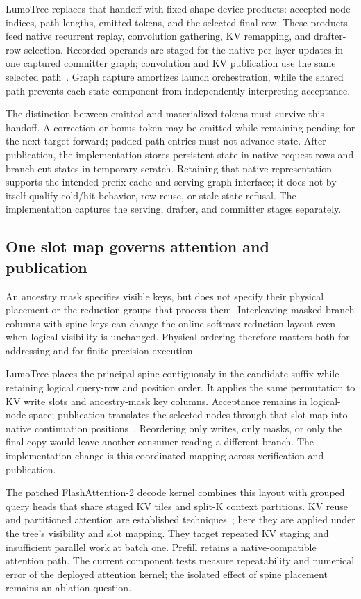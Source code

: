 \documentclass[conference]{IEEEtran}
\newcommand{\sys}{LumoTree}
\begin{document}
\sys{} replaces that handoff with fixed-shape device products: accepted node indices, path lengths, emitted tokens, and the selected final row. These products feed native recurrent replay, convolution gathering, KV remapping, and drafter-row selection. Recorded operands are staged for the native per-layer updates in one captured committer graph; convolution and KV publication use the same selected path~\cite{lumo2026archive}. Graph capture amortizes launch orchestration, while the shared path prevents each state component from independently interpreting acceptance.

The distinction between emitted and materialized tokens must survive this handoff. A correction or bonus token may be emitted while remaining pending for the next target forward; padded path entries must not advance state. After publication, the implementation stores persistent state in native request rows and branch cut states in temporary scratch. Retaining that native representation supports the intended prefix-cache and serving-graph interface; it does not by itself qualify cold/hit behavior, row reuse, or stale-state refusal. The implementation captures the serving, drafter, and committer stages separately.

\subsection{One slot map governs attention and publication}
\label{sec:reconstruction-numerics}
An ancestry mask specifies visible keys, but does not specify their physical placement or the reduction groups that process them. Interleaving masked branch columns with spine keys can change the online-softmax reduction layout even when logical visibility is unchanged. Physical ordering therefore matters both for addressing and for finite-precision execution~\cite{he2025determinism}.

\sys{} places the principal spine contiguously in the candidate suffix while retaining logical query-row and position order. It applies the same permutation to KV write slots and ancestry-mask key columns. Acceptance remains in logical-node space; publication translates the selected nodes through that slot map into native continuation positions~\cite{lumo2026archive}. Reordering only writes, only masks, or only the final copy would leave another consumer reading a different branch. The implementation change is this coordinated mapping across verification and publication.

The patched FlashAttention-2 decode kernel combines this layout with grouped query heads that share staged KV tiles and split-K context partitions. KV reuse and partitioned attention are established techniques~\cite{yao2024deft,pan2025fasttree}; here they are applied under the tree's visibility and slot mapping. They target repeated KV staging and insufficient parallel work at batch one. Prefill retains a native-compatible attention path. The current component tests measure repeatability and numerical error of the deployed attention kernel; the isolated effect of spine placement remains an ablation question.
\end{document}
